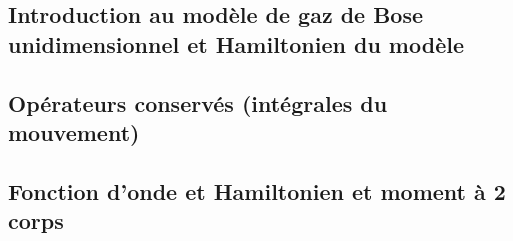 \subsection{Introduction au modèle de gaz de Bose unidimensionnel et Hamiltonien du modèle}
%




%
%


%


%

\subsection{Opérateurs conservés (intégrales du mouvement)}
%
%


 
%
%

\subsection{Fonction d’onde et Hamiltonien et moment à 2 corps}










%



%

